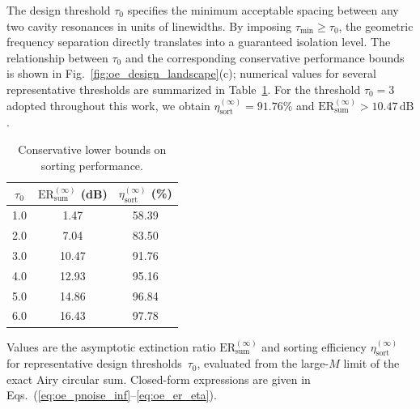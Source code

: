 \documentclass{optica-article}
\begin{document}
The design threshold $\tau_0$ specifies the minimum acceptable spacing between any two cavity resonances in units of linewidths. By imposing $\tau_{\min}\ge\tau_0$, the geometric frequency separation directly translates into a guaranteed isolation level. The relationship between $\tau_0$ and the corresponding conservative performance bounds is shown in Fig.~\ref{fig:oe_design_landscape}(c); numerical values for several representative thresholds are summarized in Table~\ref{tab:oe_tau_bounds}. For the threshold $\tau_0=3$ adopted throughout this work, we obtain $\eta_{\mathrm{sort}}^{(\infty)}=91.76\%$ and $\mathrm{ER}_{\mathrm{sum}}^{(\infty)}>10.47\,\mathrm{dB}$.

\begin{table}[htbp]
\centering
\caption{Conservative lower bounds on sorting performance.}
\label{tab:oe_tau_bounds}
\begin{tabular}{ccc}
\hline
$\tau_0$ & $\mathrm{ER}_{\mathrm{sum}}^{(\infty)}$ (dB) & $\eta_{\mathrm{sort}}^{(\infty)}$ (\%) \\
\hline
1.0 &  1.47 & 58.39 \\
2.0 &  7.04 & 83.50 \\
3.0 & 10.47 & 91.76 \\
4.0 & 12.93 & 95.16 \\
5.0 & 14.86 & 96.84 \\
6.0 & 16.43 & 97.78 \\
\hline
\end{tabular}

\smallskip
\begin{minipage}{4.25in}
\footnotesize
\setlength{\parindent}{0pt}
Values are the asymptotic extinction ratio $\mathrm{ER}_{\mathrm{sum}}^{(\infty)}$ and sorting efficiency $\eta_{\mathrm{sort}}^{(\infty)}$ for representative design thresholds~$\tau_0$, evaluated from the large-$M$ limit of the exact Airy circular sum. Closed-form expressions are given in Eqs.~(\ref{eq:oe_pnoise_inf}--\ref{eq:oe_er_eta}).
\end{minipage}
\end{table}
\end{document}
